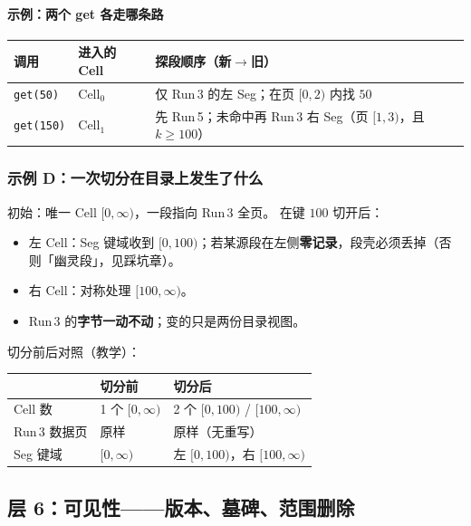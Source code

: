 \paragraph{示例：两个 get 各走哪条路}
\begin{center}
\small
\begin{tabular}{@{}llp{6.6cm}@{}}
\toprule
调用 & 进入的 Cell & 探段顺序（新$\to$旧） \\
\midrule
\texttt{get(50)} & Cell$_0$ & 仅 Run\,3 的左 Seg；在页 $[0,2)$ 内找 $50$ \\
\texttt{get(150)} & Cell$_1$ & 先 Run\,5；未命中再 Run\,3 右 Seg（页 $[1,3)$，且 $k\ge100$） \\
\bottomrule
\end{tabular}
\end{center}

\subsubsection{示例 D：一次切分在目录上发生了什么}
初始：唯一 Cell $[0,\infty)$，一段指向 Run\,3 全页。
在键 $100$ 切开后：

\begin{itemize}[leftmargin=1.4em]
  \item 左 Cell：Seg 键域收到 $[0,100)$；若某源段在左侧\textbf{零记录}，段壳必须丢掉（否则「幽灵段」，见踩坑章）。
  \item 右 Cell：对称处理 $[100,\infty)$。
  \item Run\,3 的\textbf{字节一动不动}；变的只是两份目录视图。
\end{itemize}

切分前后对照（教学）：

\begin{center}
\small
\begin{tabular}{@{}lp{5.2cm}p{5.2cm}@{}}
\toprule
 & 切分前 & 切分后 \\
\midrule
Cell 数 & 1 个 $[0,\infty)$ & 2 个 $[0,100)$ / $[100,\infty)$ \\
Run\,3 数据页 & 原样 & 原样（无重写） \\
Seg 键域 & $[0,\infty)$ & 左 $[0,100)$，右 $[100,\infty)$ \\
\bottomrule
\end{tabular}
\end{center}

\subsection{层 6：可见性——版本、墓碑、范围删除}
\label{sec:cd-vis}

